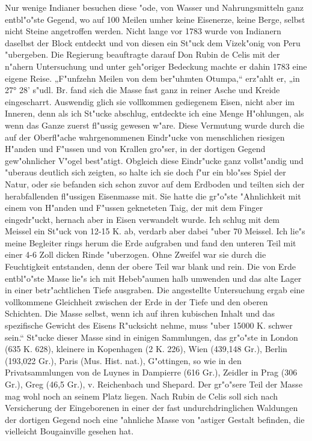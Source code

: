 \documentclass[a4paper, 11pt, oneside]{article}
\begin{document}
Nur wenige Indianer besuchen diese "ode, von Wasser und Nahrungsmitteln ganz entbl"o"ste Gegend, wo auf 100 Meilen umher keine Eisenerze, keine Berge, selbst nicht Steine angetroffen werden. Nicht lange vor 1783 wurde von Indianern daselbst der Block entdeckt und von diesen ein St"uck dem Vizek"onig von Peru "ubergeben. Die Regierung beauftragte darauf Don Rubin de Celis mit der n"ahern Untersuchung und unter geh"origer Bedeckung machte er dahin 1783 eine eigene Reise. „F"unfzehn Meilen von dem ber"uhmten Otumpa,“ erz"ahlt er, „in 27° 28' s"udl. Br. fand sich die Masse fast ganz in reiner Asche und Kreide eingescharrt. Auswendig glich sie vollkommen gediegenem Eisen, nicht aber im Inneren, denn als ich St"ucke abschlug, entdeckte ich eine Menge H"ohlungen, als wenn das Ganze zuerst fl"ussig gewesen w"are. Diese Vermutung wurde durch die auf der Oberfl"ache wahrgenommenen Eindr"ucke von menschlichen riesigen H"anden und F"ussen und von Krallen gro"ser, in der dortigen Gegend gew"ohnlicher V"ogel best"atigt. Obgleich diese Eindr"ucke ganz vollst"andig und "uberaus deutlich sich zeigten, so halte ich sie doch f"ur ein blo"ses Spiel der Natur, oder sie befanden sich schon zuvor auf dem Erdboden und teilten sich der herabfallenden fl"ussigen Eisenmasse mit. Sie hatte die gr"o"ste "Ahnlichkeit mit einem von H"anden und F"ussen gekneteten Taig, der mit dem Finger eingedr"uckt, hernach aber in Eisen verwandelt wurde. Ich schlug mit dem Meissel ein St"uck von 12-15 K. ab, verdarb aber dabei "uber 70 Meissel. Ich lie"s meine Begleiter rings herum die Erde aufgraben und fand den unteren Teil mit einer 4-6 Zoll dicken Rinde "uberzogen. Ohne Zweifel war sie durch die Feuchtigkeit entstanden, denn der obere Teil war blank und rein. Die von Erde entbl"o"ste Masse lie"s ich mit Hebeb"aumen halb umwenden und das alte Lager in einer betr"achtlichen Tiefe ausgraben. Die angestellte Untersuchung ergab eine vollkommene Gleichheit zwischen der Erde in der Tiefe und den oberen Schichten. Die Masse selbst, wenn ich auf ihren kubischen Inhalt und das spezifische Gewicht des Eisens R"ucksicht nehme, muss "uber 15000 K. schwer sein.“ St"ucke dieser Masse sind in einigen Sammlungen, das gr"o"ste in London (635 K. 628), kleinere in Kopenhagen (2 K. 226), Wien (439,148 Gr.), Berlin (193,022 Gr.), Paris (Mus. Hist. nat.), G"ottingen, so wie in den Privatsammlungen von de Luynes in Dampierre (616 Gr.), Zeidler in Prag (306 Gr.), Greg (46,5 Gr.), v. Reichenbach und Shepard. Der gr"o"sere Teil der Masse mag wohl noch an seinem Platz liegen. Nach Rubin de Celis soll sich nach Versicherung der Eingeborenen in einer der fast undurchdringlichen Waldungen der dortigen Gegend noch eine "ahnliche Masse von "astiger Gestalt befinden, die vielleicht Bougainville gesehen hat.
\end{document}
